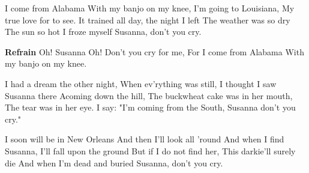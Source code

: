 \footnotemark [
ititle={Oh! Susanna}]

\beginverse
I come from Alabama
With my banjo on my knee,
I'm going to Louisiana,
My true love for to see.
It trained all day, the night I left
The weather was so dry
The sun so hot I froze myself
Susanna, don't you cry.
\endverse

\beginchorus
\textbf{Refrain}
Oh! Susanna
Oh! Don't you cry for me,
For I come from Alabama
With my banjo on my knee.
\endchorus

\beginverse
I had a dream the other night,
When ev'rything was still,
I thought I saw Susanna there
Acoming down the hill,
The buckwheat cake was in her mouth,
The tear was in her eye.
I say: "I'm coming from the South,
Susanna don't you cry."
\endverse

\beginverse
I soon will be in New Orleans
And then I'll look all 'round
And when I find Susanna,
I'll fall upon the ground
But if I do not find her,
This darkie'll surely die
And when I'm dead and buried
Susanna, don't you cry.
\endverse
\endsong